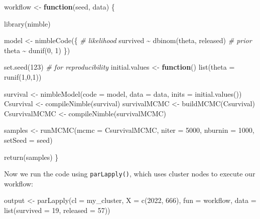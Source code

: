 \documentclass[
  12pt,
]{krantz}
\newenvironment{Shaded}{\begin{snugshade}}{\end{snugshade}}
\newcommand{\AttributeTok}[1]{\textcolor[rgb]{0.77,0.63,0.00}{#1}}
\newcommand{\CommentTok}[1]{\textcolor[rgb]{0.56,0.35,0.01}{\textit{#1}}}
\newcommand{\ControlFlowTok}[1]{\textcolor[rgb]{0.13,0.29,0.53}{\textbf{#1}}}
\newcommand{\DecValTok}[1]{\textcolor[rgb]{0.00,0.00,0.81}{#1}}
\newcommand{\FunctionTok}[1]{\textcolor[rgb]{0.00,0.00,0.00}{#1}}
\newcommand{\NormalTok}[1]{#1}
\newcommand{\OtherTok}[1]{\textcolor[rgb]{0.56,0.35,0.01}{#1}}
\newcommand{\SpecialCharTok}[1]{\textcolor[rgb]{0.00,0.00,0.00}{#1}}
\begin{document}
\begin{Shaded}
\begin{Highlighting}[]
\NormalTok{workflow }\OtherTok{\textless{}{-}} \ControlFlowTok{function}\NormalTok{(seed, data) \{}
  
  \FunctionTok{library}\NormalTok{(nimble)}
  
\NormalTok{  model }\OtherTok{\textless{}{-}} \FunctionTok{nimbleCode}\NormalTok{(\{}
    \CommentTok{\# likelihood}
\NormalTok{    survived }\SpecialCharTok{\textasciitilde{}} \FunctionTok{dbinom}\NormalTok{(theta, released)}
    \CommentTok{\# prior}
\NormalTok{    theta }\SpecialCharTok{\textasciitilde{}} \FunctionTok{dunif}\NormalTok{(}\DecValTok{0}\NormalTok{, }\DecValTok{1}\NormalTok{)}
\NormalTok{  \})}
  
  \FunctionTok{set.seed}\NormalTok{(}\DecValTok{123}\NormalTok{) }\CommentTok{\# for reproducibility}
\NormalTok{  initial.values }\OtherTok{\textless{}{-}} \ControlFlowTok{function}\NormalTok{() }\FunctionTok{list}\NormalTok{(}\AttributeTok{theta =} \FunctionTok{runif}\NormalTok{(}\DecValTok{1}\NormalTok{,}\DecValTok{0}\NormalTok{,}\DecValTok{1}\NormalTok{))}
  
\NormalTok{  survival }\OtherTok{\textless{}{-}} \FunctionTok{nimbleModel}\NormalTok{(}\AttributeTok{code =}\NormalTok{ model, }
                          \AttributeTok{data =}\NormalTok{ data, }
                          \AttributeTok{inits =} \FunctionTok{initial.values}\NormalTok{())}
\NormalTok{  Csurvival }\OtherTok{\textless{}{-}} \FunctionTok{compileNimble}\NormalTok{(survival)}
\NormalTok{  survivalMCMC }\OtherTok{\textless{}{-}} \FunctionTok{buildMCMC}\NormalTok{(Csurvival)}
\NormalTok{  CsurvivalMCMC }\OtherTok{\textless{}{-}} \FunctionTok{compileNimble}\NormalTok{(survivalMCMC)}
  
\NormalTok{  samples }\OtherTok{\textless{}{-}} \FunctionTok{runMCMC}\NormalTok{(}\AttributeTok{mcmc =}\NormalTok{ CsurvivalMCMC, }
                     \AttributeTok{niter =} \DecValTok{5000}\NormalTok{, }
                     \AttributeTok{nburnin =} \DecValTok{1000}\NormalTok{,}
                     \AttributeTok{setSeed =}\NormalTok{ seed)}
  
  \FunctionTok{return}\NormalTok{(samples)}
\NormalTok{\}}
\end{Highlighting}
\end{Shaded}

Now we run the code using \texttt{parLapply()}, which uses cluster nodes to execute our workflow:

\begin{Shaded}
\begin{Highlighting}[]
\NormalTok{output }\OtherTok{\textless{}{-}} \FunctionTok{parLapply}\NormalTok{(}\AttributeTok{cl =}\NormalTok{ my\_cluster, }
                    \AttributeTok{X =} \FunctionTok{c}\NormalTok{(}\DecValTok{2022}\NormalTok{, }\DecValTok{666}\NormalTok{),}
                    \AttributeTok{fun =}\NormalTok{ workflow, }
                    \AttributeTok{data =} \FunctionTok{list}\NormalTok{(}\AttributeTok{survived =} \DecValTok{19}\NormalTok{, }\AttributeTok{released =} \DecValTok{57}\NormalTok{))}
\end{Highlighting}
\end{Shaded}
\end{document}
